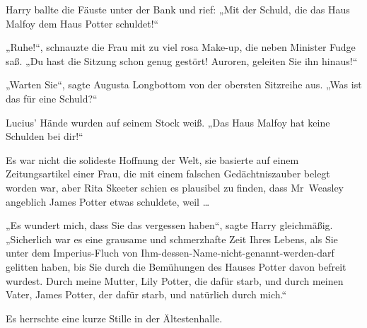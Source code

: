 Harry ballte die Fäuste unter der Bank und rief:
„Mit der Schuld, die das Haus Malfoy dem Haus Potter schuldet!“

„Ruhe!“, schnauzte die Frau mit zu viel rosa Make-up, die neben Minister Fudge saß.
„Du hast die Sitzung schon genug gestört! Auroren, geleiten Sie ihn hinaus!“

„Warten Sie“, sagte Augusta Longbottom von der obersten Sitzreihe aus.
„Was ist das für eine Schuld?“

Lucius’ Hände wurden auf seinem Stock weiß.
„Das Haus Malfoy hat keine Schulden bei dir!“

Es war nicht die solideste Hoffnung der Welt, sie basierte auf einem Zeitungsartikel einer Frau, die mit einem falschen Gedächtniszauber belegt worden war, aber Rita Skeeter schien es plausibel zu finden, dass Mr~Weasley angeblich James Potter etwas schuldete, weil …

„Es wundert mich, dass Sie das vergessen haben“, sagte Harry gleichmäßig.
„Sicherlich war es eine grausame und schmerzhafte Zeit Ihres Lebens, als Sie unter dem Imperius-Fluch von Ihm-dessen-Name-nicht-genannt-werden-darf gelitten haben, bis Sie durch die Bemühungen des Hauses Potter davon befreit wurdest. Durch meine Mutter, Lily Potter, die dafür starb, und durch meinen Vater, James Potter, der dafür starb, und natürlich durch mich.“

Es herrschte eine kurze Stille in der Ältestenhalle.

